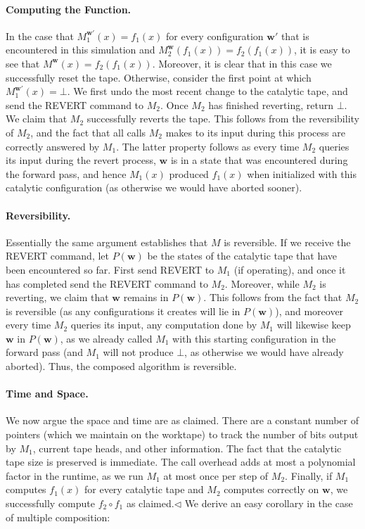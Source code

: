 \documentclass[10pt,a4paper]{article}
\begin{document}
\paragraph{Computing the Function.} In the case that $M_1^{\mathbf w'}(x)=f_1(x)$ for every configuration $\mathbf w'$ that is encountered in this simulation and $M_2^{\mathbf w}(f_1(x))=f_2(f_1(x))$, it is easy to see that $M^{\mathbf w}(x)=f_2(f_1(x))$. Moreover, it is clear that in this case we successfully reset the tape.
Otherwise, consider the first point at which $M_1^{\mathbf w'}(x)=\bot$. We first undo the most recent change to the catalytic tape, and send the REVERT command to $M_2$. Once $M_2$ has finished reverting, return $\bot$. We claim that $M_2$ successfully reverts the tape. This follows from the reversibility of $M_2$, and the fact that all calls $M_2$ makes to its input during this process are correctly answered by $M_1$. The latter property follows as every time $M_2$ queries its input during the revert process, $\mathbf w$ is in a state that was encountered during the forward pass, and hence $M_1(x)$ produced $f_1(x)$ when initialized with this catalytic configuration (as otherwise we would have aborted sooner).
\paragraph{Reversibility.} Essentially the same argument establishes that $M$ is reversible. If we receive the REVERT command, let $P(\mathbf w)$ be the states of the catalytic tape that have been encountered so far. First send REVERT to $M_1$ (if operating), and once it has completed send the REVERT command to $M_2$. Moreover, while $M_2$ is reverting, we claim that $\mathbf w$ remains in $P(\mathbf w)$. This follows from the fact that $M_2$ is reversible (as any configurations it creates will lie in $P(\mathbf w)$), and moreover every time $M_2$ queries its input, any computation done by $M_1$ will likewise keep $\mathbf w$ in $P(\mathbf w)$, as we already called $M_1$ with this starting configuration in the forward pass (and $M_1$ will not produce $\bot$, as otherwise we would have already aborted). Thus, the composed algorithm is reversible.
\paragraph{Time and Space.} We now argue the space and time are as claimed. There are a constant number of pointers (which we maintain on the worktape) to track the number of bits output by $M_1$, current tape heads, and other information. The fact that the catalytic tape size is preserved is immediate. The call overhead adds at most a polynomial factor in the runtime, as we run $M_1$ at most once per step of $M_2$. Finally, if $M_1$ computes $f_1(x)$ for every catalytic tape and $M_2$ computes correctly on $\mathbf w$, we successfully compute $f_2\circ f_1$ as claimed.\hfill$\triangleleft$
We derive an easy corollary in the case of multiple composition:
\end{document}
